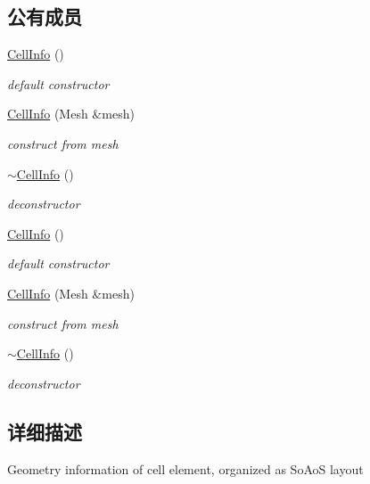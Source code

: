 \subsection*{公有成员}
\begin{DoxyCompactItemize}
\item 
\hyperlink{classCellInfo_ae62d1b965db7b566806e13862e29daec}{CellInfo} ()
\begin{DoxyCompactList}\small\item\em default constructor \item\end{DoxyCompactList}\item 
\hyperlink{classCellInfo_a31364f58aca27a794a93dbed16011bc6}{CellInfo} (Mesh \&mesh)
\begin{DoxyCompactList}\small\item\em construct from mesh \item\end{DoxyCompactList}\item 
\hyperlink{classCellInfo_aea4f621af2ea308f7ecfb4118847751e}{$\sim$CellInfo} ()
\begin{DoxyCompactList}\small\item\em deconstructor \item\end{DoxyCompactList}\item 
\hyperlink{classCellInfo_ae62d1b965db7b566806e13862e29daec}{CellInfo} ()
\begin{DoxyCompactList}\small\item\em default constructor \item\end{DoxyCompactList}\item 
\hyperlink{classCellInfo_a31364f58aca27a794a93dbed16011bc6}{CellInfo} (Mesh \&mesh)
\begin{DoxyCompactList}\small\item\em construct from mesh \item\end{DoxyCompactList}\item 
\hyperlink{classCellInfo_aea4f621af2ea308f7ecfb4118847751e}{$\sim$CellInfo} ()
\begin{DoxyCompactList}\small\item\em deconstructor \item\end{DoxyCompactList}\end{DoxyCompactItemize}


\subsection{详细描述}
Geometry information of cell element, organized as SoAoS layout 

